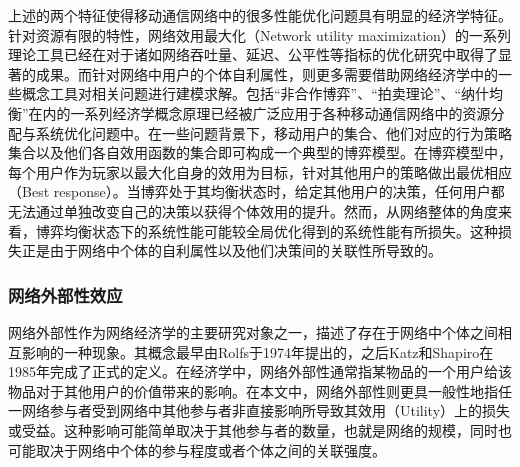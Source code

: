 上述的两个特征使得移动通信网络中的很多性能优化问题具有明显的经济学特征。针对资源有限的特性，网络效用最大化（Network utility maximization）的一系列理论工具已经在对于诸如网络吞吐量、延迟、公平性等指标的优化研究中取得了显著的成果\cite{NET}。而针对网络中用户的个体自利属性，则更多需要借助网络经济学中的一些概念工具对相关问题进行建模求解。包括“非合作博弈”、“拍卖理论”、“纳什均衡”在内的一系列经济学概念原理\cite{osborne}已经被广泛应用于各种移动通信网络中的资源分配与系统优化问题中。在一些问题背景下，移动用户的集合、他们对应的行为策略集合以及他们各自效用函数的集合即可构成一个典型的博弈模型。在博弈模型中，每个用户作为玩家以最大化自身的效用为目标，针对其他用户的策略做出最优相应（Best response）。当博弈处于其均衡状态时，给定其他用户的决策，任何用户都无法通过单独改变自己的决策以获得个体效用的提升。然而，从网络整体的角度来看，博弈均衡状态下的系统性能可能较全局优化得到的系统性能有所损失。这种损失正是由于网络中个体的自利属性以及他们决策间的关联性所导致的。



\subsubsection{网络外部性效应}

网络外部性作为网络经济学的主要研究对象之一，描述了存在于网络中个体之间相互影响的一种现象。其概念最早由Rolfs于1974年提出的\cite{Rolfs}，之后Katz和Shapiro在1985年完成了正式的定义\cite{Katz}。在经济学中，网络外部性通常指某物品的一个用户给该物品对于其他用户的价值带来的影响。在本文中，网络外部性则更具一般性地指任一网络参与者受到网络中其他参与者非直接影响所导致其效用（Utility）上的损失或受益。这种影响可能简单取决于其他参与者的数量，也就是网络的规模，同时也可能取决于网络中个体的参与程度或者个体之间的关联强度\cite{externality}。

